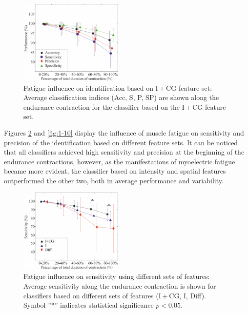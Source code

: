 \begin{figure}[ht]
\centering
\includegraphics[width=0.459\textwidth]{Images/figure1_8.png}
\caption{Fatigue influence on identification based on I + CG feature set: Average classification indices (Acc, S, P, SP) are shown along the endurance contraction for the classifier based on the I + CG feature set.}
\label{fig:1-8}
\end{figure}      

Figures \ref{fig:1-9} and \ref{fig:1-10} display the influence of muscle fatigue on sensitivity and precision of the identification based on different feature sets. It can be noticed that all classifiers achieved high sensitivity and precision at the beginning of the endurance contractions, however, as the manifestations of myoelectric fatigue became more evident, the classifier based on intensity and spatial features outperformed the other two, both in average performance and variability.

\begin{figure}[ht]
\centering
\includegraphics[width=0.459\textwidth]{Images/figure1_9.png}
\caption{Fatigue influence on sensitivity using different sets of features: Average sensitivity along the endurance contraction is shown for classifiers based on different sets of features (I + CG, I, Diff). Symbol ”*” indicates statistical significance $p < 0.05$.}
\label{fig:1-9}
\end{figure}      

